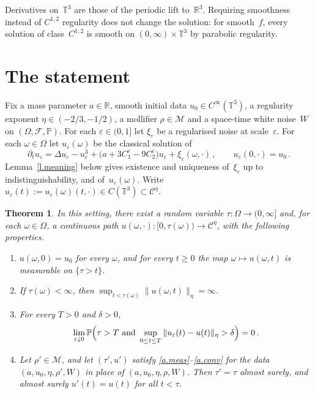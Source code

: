\documentclass[11pt,letterpaper]{article}
\numberwithin{equation}{section}
\theoremstyle{plain}
\newtheorem{maintheorem}{Theorem}
\theoremstyle{definition}
\theoremstyle{remark}
\newcommand{\R}{\mathbb{R}}
\newcommand{\T}{\mathbb{T}^3}
\newcommand{\Prob}{\mathbb{P}}
\newcommand{\Mol}{\mathcal{M}}
\newcommand{\Cs}{\mathcal{C}}
\newcommand{\nf}[2]{#1/#2}
\newcommand{\1}{\mathbf{1}}
\begin{document}
Derivatives on~$\T$ are those of the periodic lift to~$\R^3$. Requiring smoothness instead of $C^{1,2}$ regularity does not change the solution: for smooth~$f$, every solution of class~$C^{1,2}$ is smooth on $(0,\infty)\times\T$ by parabolic regularity.

\section{The statement}
\label{s.statement}

Fix a mass parameter $a\in\R$, smooth initial data $u_0\in C^\infty(\T)$, a regularity exponent $\eta\in(-\nf{2}{3},-\nf{1}{2})$, a mollifier $\rho\in\Mol$ and a space-time white noise~$W$ on $(\Omega,\mathcal{F},\Prob)$. For each $\varepsilon\in(0,1]$ let $\xi_\varepsilon$ be a regularised noise at scale~$\varepsilon$. For each $\omega\in\Omega$ let $u_\varepsilon(\omega)$ be the classical solution of
\begin{equation}
\label{e.renormalised}
\partial_tu_\varepsilon=\Delta u_\varepsilon-u_\varepsilon^3+\bigl(a+3C_1^\varepsilon-9C_2^\varepsilon\bigr)u_\varepsilon+\xi_\varepsilon(\omega,\cdot)\,, \qquad u_\varepsilon(0,\cdot)=u_0\,.
\end{equation}
Lemma~\ref{l.meaning} below gives existence and uniqueness of~$\xi_\varepsilon$ up to indistinguishability, and of~$u_\varepsilon(\omega)$. Write $u_\varepsilon(t):=u_\varepsilon(\omega)(t,\cdot)\in C(\T)\subset\Cs^\eta$.

\begin{maintheorem}
\label{t.main}
In this setting, there exist a random variable $\tau\colon\Omega\to(0,\infty]$ and, for each $\omega\in\Omega$, a continuous path $u(\omega,\cdot)\colon[0,\tau(\omega))\to\Cs^\eta$, with the following properties.
\begin{enumerate}[label=\textup{(A\arabic*)}]
\item \label{a.meas} $u(\omega,0)=u_0$ for every $\omega$, and for every $t\ge0$ the map $\omega\mapsto u(\omega,t)$ is measurable on $\{\tau>t\}$.
\item \label{a.max} If $\tau(\omega)<\infty$, then $\sup_{t<\tau(\omega)}\|u(\omega,t)\|_\eta=\infty$.
\item \label{a.conv} For every $T>0$ and $\delta>0$,
\begin{equation}
\label{e.conv}
\lim_{\varepsilon\downarrow0}\Prob\Bigl(\tau>T\ \text{and}\ \sup_{0\le t\le T}\|u_\varepsilon(t)-u(t)\|_\eta>\delta\Bigr)=0\,.
\end{equation}
\item \label{a.indep} Let $\rho'\in\Mol$, and let $(\tau',u')$ satisfy \ref{a.meas}--\ref{a.conv} for the data $(a,u_0,\eta,\rho',W)$ in place of $(a,u_0,\eta,\rho,W)$. Then $\tau'=\tau$ almost surely, and almost surely $u'(t)=u(t)$ for all $t<\tau$.
\end{enumerate}
\end{maintheorem}
\end{document}
